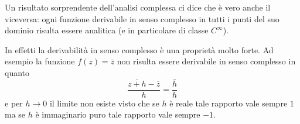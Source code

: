 Un risultato sorprendente dell'analisi complessa ci dice
che è vero anche il viceversa: ogni funzione
derivabile in senso complesso in tutti i punti del suo
dominio risulta essere analitica (e in particolare di classe
$C^\infty$).

In effetti la derivabilità in senso complesso è una proprietà
molto forte. Ad esempio la funzione $f(z) = \bar z$
non risulta essere derivabile in senso complesso in quanto
\[
\frac{\overline{z+h}-\overline z}{h} = \frac{\bar h}{h}
\]
e per $h\to 0$ il limite non esiste visto che se
$h$ è reale tale rapporto vale sempre $1$
ma se $h$ è immaginario puro tale rapporto vale sempre $-1$.

